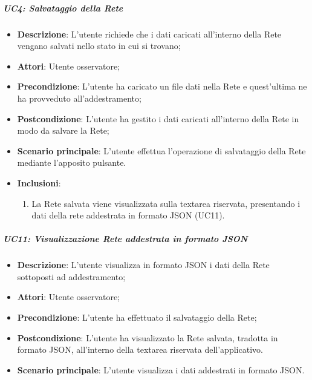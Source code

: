 \subparagraph{UC4: Salvataggio della Rete}\mbox{} 
\label{UC4: Salvataggio della Rete}
\noindent
\begin{itemize}
\item \textbf{Descrizione}: L'utente richiede che i dati caricati all'interno della Rete vengano salvati nello stato in cui si trovano;
\item \textbf{Attori}: Utente osservatore;
\item \textbf{Precondizione}: L'utente ha caricato un file dati nella Rete e quest'ultima ne ha provveduto all'addestramento;
\item \textbf{Postcondizione}: L'utente ha gestito i dati caricati all'interno della Rete in modo da salvare la Rete;
\item \textbf{Scenario principale}: L'utente effettua l'operazione di salvataggio della Rete mediante l'apposito pulsante.
\item \textbf{Inclusioni}:
\begin{enumerate}
\item La Rete salvata viene visualizzata sulla textarea riservata, presentando i dati della rete addestrata in formato JSON (UC11).
\end{enumerate}
\end{itemize}

\subparagraph{UC11: Visualizzazione Rete addestrata in formato JSON}\mbox{}
\label{UC11: Visualizzazione Rete addestrata in formato JSON}
\noindent
\begin{itemize}
\item \textbf{Descrizione}: L'utente visualizza in formato JSON i dati della Rete sottoposti ad addestramento;
\item \textbf{Attori}: Utente osservatore;
\item \textbf{Precondizione}: L'utente ha effettuato il salvataggio della Rete;
\item \textbf{Postcondizione}: L'utente ha visualizzato la Rete salvata, tradotta in formato JSON, all'interno della textarea riservata dell'applicativo.
\item \textbf{Scenario principale}: L'utente visualizza i dati addestrati in formato JSON.
\end{itemize}


